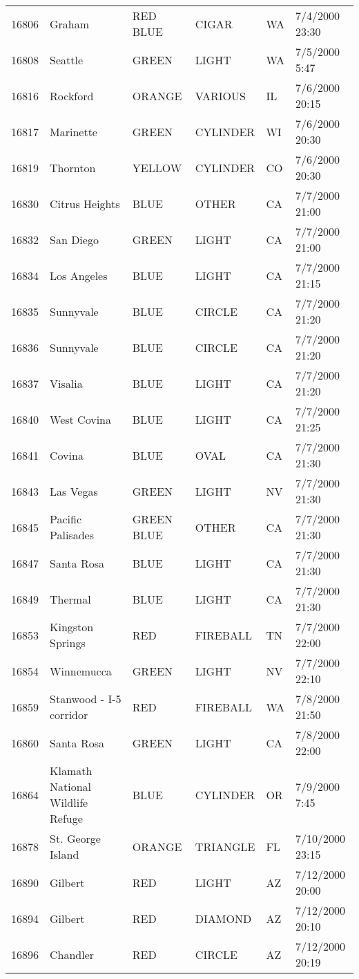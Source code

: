 \begin{tabular}{llllll}
16806 & Graham & RED BLUE & CIGAR & WA & 7/4/2000 23:30 \\
16808 & Seattle & GREEN & LIGHT & WA & 7/5/2000 5:47 \\
16816 & Rockford & ORANGE & VARIOUS & IL & 7/6/2000 20:15 \\
16817 & Marinette & GREEN & CYLINDER & WI & 7/6/2000 20:30 \\
16819 & Thornton & YELLOW & CYLINDER & CO & 7/6/2000 20:30 \\
16830 & Citrus Heights & BLUE & OTHER & CA & 7/7/2000 21:00 \\
16832 & San Diego & GREEN & LIGHT & CA & 7/7/2000 21:00 \\
16834 & Los Angeles & BLUE & LIGHT & CA & 7/7/2000 21:15 \\
16835 & Sunnyvale & BLUE & CIRCLE & CA & 7/7/2000 21:20 \\
16836 & Sunnyvale & BLUE & CIRCLE & CA & 7/7/2000 21:20 \\
16837 & Visalia & BLUE & LIGHT & CA & 7/7/2000 21:20 \\
16840 & West Covina & BLUE & LIGHT & CA & 7/7/2000 21:25 \\
16841 & Covina & BLUE & OVAL & CA & 7/7/2000 21:30 \\
16843 & Las Vegas & GREEN & LIGHT & NV & 7/7/2000 21:30 \\
16845 & Pacific Palisades & GREEN BLUE & OTHER & CA & 7/7/2000 21:30 \\
16847 & Santa Rosa & BLUE & LIGHT & CA & 7/7/2000 21:30 \\
16849 & Thermal & BLUE & LIGHT & CA & 7/7/2000 21:30 \\
16853 & Kingston Springs & RED & FIREBALL & TN & 7/7/2000 22:00 \\
16854 & Winnemucca & GREEN & LIGHT & NV & 7/7/2000 22:10 \\
16859 & Stanwood - I-5 corridor & RED & FIREBALL & WA & 7/8/2000 21:50 \\
16860 & Santa Rosa & GREEN & LIGHT & CA & 7/8/2000 22:00 \\
16864 & Klamath National Wildlife Refuge & BLUE & CYLINDER & OR & 7/9/2000 7:45 \\
16878 & St. George Island & ORANGE & TRIANGLE & FL & 7/10/2000 23:15 \\
16890 & Gilbert & RED & LIGHT & AZ & 7/12/2000 20:00 \\
16894 & Gilbert & RED & DIAMOND & AZ & 7/12/2000 20:10 \\
16896 & Chandler & RED & CIRCLE & AZ & 7/12/2000 20:19 \\

\end{tabular}
